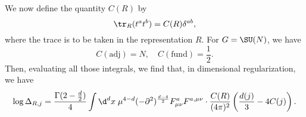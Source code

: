 \documentclass[a4paper]{article}
\begin{document}
We now define the quantity $C(R)$ by
\[
  \tr_R (t^a t^b) = C(R) \delta^{ab},
\]
where the trace is to be taken in the representation $R$. For $G = \SU(N)$, we have
\[
  C(\mathrm{adj}) = N,\quad C(\mathrm{fund}) = \frac{1}{2}.
\]
Then, evaluating all those integrals, we find that, in dimensional regularization, we have
\[
  \log \Delta_{R, j} = \frac{\Gamma(2 - \frac{d}{2})}{4} \int \d^d x\; \mu^{4 - d}(-\partial^2)^{\frac{d - 4}{2}} F_{\mu\nu}^a F^{a, \mu\nu} \cdot \frac{C(R)}{(4\pi)^2} \left(\frac{d(j)}{3} - 4 C(j)\right).
\]
%
%
%
\end{document}
